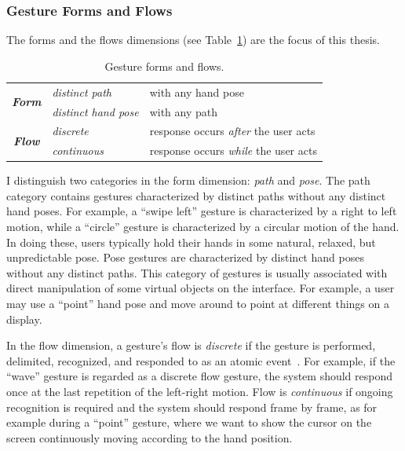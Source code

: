\subsubsection{Gesture Forms and Flows}
The forms and the flows dimensions (see Table~\ref{tab:taxonomy}) are the focus of this
thesis.

\begin{table}[tbh]
\centering
\begin{tabular}{|c|l|l|}
\hline
\multirow{2}{*}{\textbf{\textit{Form}}} & \textit{distinct path} & with any hand
pose
\\
\cline{2-3} 
                               & \textit{distinct hand pose} & with any path \\
\hline
\multirow{2}{*}{\textbf{\textit{Flow}}} & \textit{discrete} & response occurs
\textit{after} the user acts \\
\cline{2-3}
              & \textit{continuous} & response occurs \textit{while} the user
              acts \\
\hline
\end{tabular}
\caption{Gesture forms and flows.}
\label{tab:taxonomy}
\end{table}

I distinguish two
categories in the form dimension: \textit{path} and \textit{pose}. The path
category contains gestures characterized by distinct paths without any distinct
hand poses. For example, a ``swipe left'' gesture is characterized by a
right to left motion, while a ``circle'' gesture is characterized by a
circular motion of the hand. In doing these, users typically hold their
hands in some natural, relaxed, but unpredictable pose. Pose
gestures are characterized by distinct hand poses without any distinct paths.
This category of gestures is usually associated with direct manipulation of some virtual
objects on the interface.
For example, a user may use a ``point'' hand pose and move around to
point at different things on a display.

In the flow dimension, a gesture's flow is
\textit{discrete} if the gesture is performed, delimited, recognized, and
responded to as an atomic event~\cite{wobbrock09}. For example, if the ``wave'' gesture is
regarded as a discrete flow gesture, the system should respond once at the last
repetition of the left-right motion. Flow is \textit{continuous} if ongoing
recognition is required and the system should respond frame by frame, as for example during a ``point'' gesture, where we want to show the cursor on the screen
continuously moving according to the hand position. 

